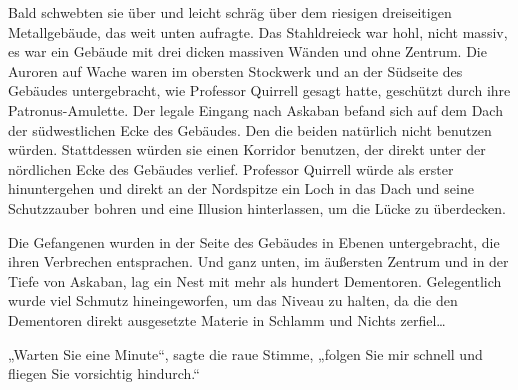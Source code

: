 Bald schwebten sie über und leicht schräg über dem riesigen dreiseitigen Metallgebäude, das weit unten aufragte. Das Stahldreieck war hohl, nicht massiv, es war ein Gebäude mit drei dicken massiven Wänden und ohne Zentrum. Die Auroren auf Wache waren im obersten Stockwerk und an der Südseite des Gebäudes untergebracht, wie Professor Quirrell gesagt hatte, geschützt durch ihre Patronus-Amulette. Der legale Eingang nach Askaban befand sich auf dem Dach der südwestlichen Ecke des Gebäudes. Den die beiden natürlich nicht benutzen würden. Stattdessen würden sie einen Korridor benutzen, der direkt unter der nördlichen Ecke des Gebäudes verlief. Professor Quirrell würde als erster hinuntergehen und direkt an der Nordspitze ein Loch in das Dach und seine Schutzzauber bohren und eine Illusion hinterlassen, um die Lücke zu überdecken.

Die Gefangenen wurden in der Seite des Gebäudes in Ebenen untergebracht, die ihren Verbrechen entsprachen. Und ganz unten, im äußersten Zentrum und in der Tiefe von Askaban, lag ein Nest mit mehr als hundert Dementoren. Gelegentlich wurde viel Schmutz hineingeworfen, um das Niveau zu halten, da die den Dementoren direkt ausgesetzte Materie in Schlamm und Nichts zerfiel…

„Warten Sie eine Minute“, sagte die raue Stimme, „folgen Sie mir schnell und fliegen Sie vorsichtig hindurch.“

